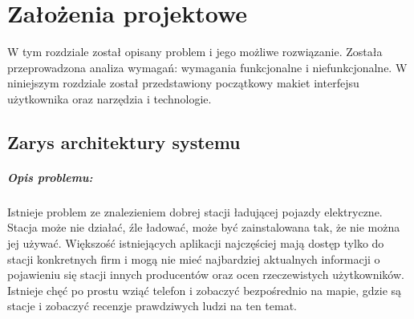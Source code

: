 \chapter{Założenia projektowe}
W tym rozdziale został opisany problem i jego możliwe rozwiązanie.
Została przeprowadzona analiza wymagań: wymagania funkcjonalne i niefunkcjonalne.
W niniejszym rozdziale został przedstawiony początkowy makiet interfejsu użytkownika oraz narzędzia i technologie.

\section{Zarys architektury systemu}



\paragraph{Opis problemu:}
Istnieje problem ze znalezieniem dobrej stacji ładującej pojazdy elektryczne.
Stacja może nie działać, źle ładować, może być zainstalowana tak, że nie można jej używać.
Większość istniejących aplikacji najczęściej mają dostęp tylko do stacji konkretnych firm i mogą nie mieć najbardziej aktualnych informacji o pojawieniu się stacji innych producentów oraz ocen rzeczewistych użytkowników.
Istnieje chęć po prostu wziąć telefon i zobaczyć bezpośrednio na mapie, gdzie są stacje i zobaczyć recenzje prawdziwych ludzi na ten temat.

